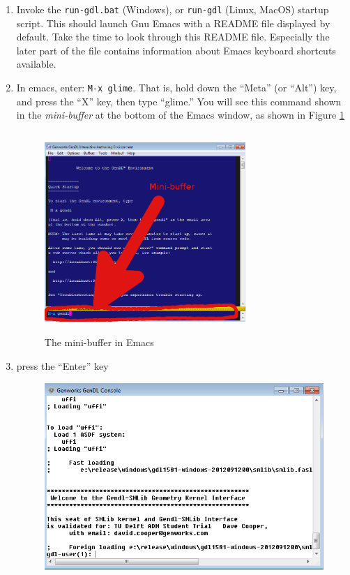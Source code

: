 \documentclass [11pt]{book}
\begin{document}
\begin{enumerate}

\item Invoke the \texttt{run-gdl.bat} (Windows), or \texttt{run-gdl} (Linux, MacOS) startup script. This should launch Gnu Emacs with a 
README file displayed by default. Take the time to look through this README file. 
Especially the later part of the file contains information about Emacs keyboard
shortcuts available.

\item In emacs, enter: \texttt{M-x glime}. That is, hold down the ``Meta'' (or ``Alt'') key, and press the ``X'' key, then type ``glime.''
You will see this command shown in the \emph{mini-buffer} at the bottom of the Emacs window, as shown in Figure 
\ref{fig:mini-buffer}

\begin{figure}
\begin{center}
\includegraphics[width=3in,height=3in]{../images/mini-buffer.png}
\end{center}

\caption{The mini-buffer in Emacs}

\label{fig:mini-buffer}

\end{figure}

\item press the ``Enter'' key

\begin{figure}
\begin{center}
\includegraphics{../images/genworks-gendl-console.png}
\end{center}


\end{figure}
\end{enumerate}
\end{document}
